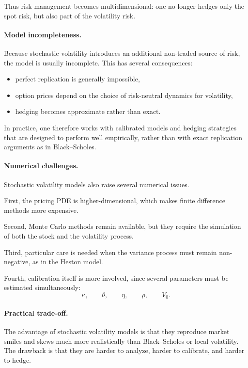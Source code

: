 \documentclass[11pt]{article}
\theoremstyle{plain}
\theoremstyle{definition}
\theoremstyle{remark}
\begin{document}
Thus risk management becomes multidimensional:
one no longer hedges only the spot risk, but also part of the volatility
risk.

\paragraph{Model incompleteness.}

Because stochastic volatility introduces an additional non-traded source
of risk, the model is usually incomplete.
This has several consequences:
\begin{itemize}[leftmargin=1.4em]
    \item perfect replication is generally impossible,
    \item option prices depend on the choice of risk-neutral dynamics for
    volatility,
    \item hedging becomes approximate rather than exact.
\end{itemize}

In practice, one therefore works with calibrated models and hedging
strategies that are designed to perform well empirically, rather than
with exact replication arguments as in Black--Scholes.

\paragraph{Numerical challenges.}

Stochastic volatility models also raise several numerical issues.

First, the pricing PDE is higher-dimensional, which makes finite
difference methods more expensive.

Second, Monte Carlo methods remain available, but they require the
simulation of both the stock and the volatility process.

Third, particular care is needed when the variance process must remain
non-negative, as in the Heston model.

Fourth, calibration itself is more involved, since several parameters
must be estimated simultaneously:
\[
\kappa,\qquad \theta,\qquad \eta,\qquad \rho,\qquad V_0.
\]

\paragraph{Practical trade-off.}

The advantage of stochastic volatility models is that they reproduce
market smiles and skews much more realistically than Black--Scholes or
local volatility.
The drawback is that they are harder to analyze, harder to calibrate,
and harder to hedge.
\end{document}
